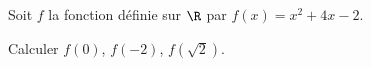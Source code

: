 
Soit $f$ la fonction définie sur $\R$ par $f(x)=x^2+4x-2$.

Calculer $f(0)$, $f(-2)$, $f\left(\sqrt{2}\right)$.